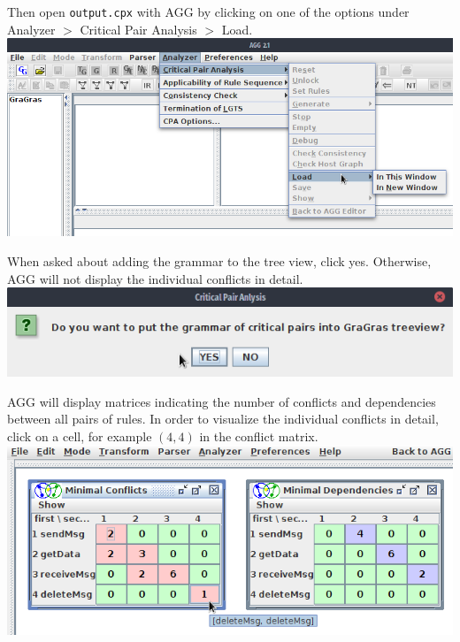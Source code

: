 \documentclass[12pt]{article}
\newenvironment{tutorialstep}
	{\hspace{-\parindent}\begin{minipage}{\textwidth}}
    {\vspace{.3cm}\end{minipage}}
\begin{document}
\begin{tutorialstep}
Then open \texttt{output.cpx} with AGG by clicking on one of the options under Analyzer $>$ Critical Pair Analysis $>$ Load. \\

\noindent
\centering
\includegraphics[scale = 0.5]{cpa_01.png}
\end{tutorialstep}

\begin{tutorialstep}
When asked about adding the grammar to the tree view, click yes. Otherwise, AGG will not display the individual conflicts in detail. \\

\noindent
\centering
\includegraphics[scale = 0.6]{cpa_02.png}
\end{tutorialstep}

\begin{tutorialstep}
AGG will display matrices indicating the number of conflicts and dependencies between all pairs of rules. In order to visualize the individual conflicts in detail, click on a cell, for example $(4,4)$ in the conflict matrix. \\

\noindent
\centering
\includegraphics[scale = 0.5]{cpa_03.png}
\end{tutorialstep}
\end{document}
